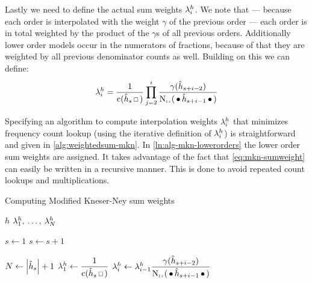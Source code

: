 Lastly we need to define the actual sum weights $\lambda_i^h$.
We note that --- because each order is interpolated with the weight $\gamma$ of
the previous order --- each order is in total weighted by the product of the
$\gamma$s of all previous orders.
Additionally lower order models occur in the numerators of fractions, because of
that they are weighted by all previous denominator counts as well.
Building on this we can define:
\begin{equation}
  \label{eq:mkn-sumweight}
  \SumWeight_i^h = \frac{1}{\Count(\DerivedHistory[s] \Skp)} \prod_{j = 2}^i \frac{\gamma(\DerivedHistory[s+i-2])}{\ContCountIp(\WSkp \DerivedHistory[s+i-1] \WSkp)}
\end{equation}

Specifying an algorithm to compute interpolation weights $\lambda_i^h$ that
minimizes frequency count lookup (using the iterative definition of
$\lambda_i^h$) is straightforward and given in \cref{alg:weightedsum-mkn}.
In \cref{ln:alg-mkn-lowerorders} the lower order sum weights are assigned.
It takes advantage of the fact that \cref{eq:mkn-sumweight} can easily be
written in a recursive manner.
This is done to avoid repeated count lookups and multiplications.

\begin{algorithm}
  \caption{Computing Modified Kneser-Ney sum weights}
  \label{alg:weightedsum-mkn}
  \begin{algorithmic}[1]
    \Require $h$
    \Ensure $\lambda_1^h, \: \ldots, \: \lambda_N^h$

    \State $s \gets 1$
      \State $s \gets s + 1$
    \EndWhile

    \vspace{0.7em}
    \State $N \gets \NGramLength{\DerivedHistory[s]} + 1$
    \vspace{0.1em}
    \State $\SumWeight_1^h \gets \dfrac{1}{\Count(\DerivedHistory[s] \Skp)}$
      \State $\SumWeight_i^h \gets \SumWeight_{i-1}^h \dfrac{\gamma(\DerivedHistory[s + i - 2])}{\ContCountIp(\WSkp \DerivedHistory[s + i - 1] \WSkp)}$
        \label{ln:alg-mkn-lowerorders}
    \EndFor
  \end{algorithmic}
\end{algorithm}



